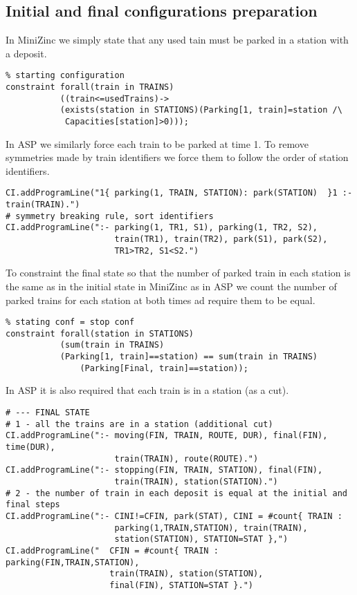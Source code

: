 \documentclass[11pt]{article}
\begin{document}
\subsection{Initial and final configurations preparation}
In MiniZinc we simply state that any used tain must be parked in a station
with a deposit.
\begin{verbatim}
% starting configuration    
constraint forall(train in TRAINS)
           ((train<=usedTrains)->
           (exists(station in STATIONS)(Parking[1, train]=station /\
            Capacities[station]>0))); 
\end{verbatim}
In ASP we similarly force each train to be parked at time 1. To remove
symmetries made by train identifiers we force them to follow the order of
station identifiers.
\begin{verbatim}
CI.addProgramLine("1{ parking(1, TRAIN, STATION): park(STATION)  }1 :- train(TRAIN).")
# symmetry breaking rule, sort identifiers
CI.addProgramLine(":- parking(1, TR1, S1), parking(1, TR2, S2), 
                      train(TR1), train(TR2), park(S1), park(S2),
                      TR1>TR2, S1<S2.")
\end{verbatim}
To constraint the final state so that the number of 
parked train in each station is the same 
as in the initial state in MiniZinc as in ASP we count
the number of parked trains for each
station at both times ad require them to be equal.  
\begin{verbatim}
% stating conf = stop conf
constraint forall(station in STATIONS)
           (sum(train in TRAINS)
           (Parking[1, train]==station) == sum(train in TRAINS)
               (Parking[Final, train]==station));                         
\end{verbatim}
In ASP it is also required that each train is in a station (as a cut).
\begin{verbatim}
# --- FINAL STATE
# 1 - all the trains are in a station (additional cut)
CI.addProgramLine(":- moving(FIN, TRAIN, ROUTE, DUR), final(FIN), time(DUR),
                      train(TRAIN), route(ROUTE).")
CI.addProgramLine(":- stopping(FIN, TRAIN, STATION), final(FIN),
                      train(TRAIN), station(STATION).")
# 2 - the number of train in each deposit is equal at the initial and final steps
CI.addProgramLine(":- CINI!=CFIN, park(STAT), CINI = #count{ TRAIN :
                      parking(1,TRAIN,STATION), train(TRAIN), 
                      station(STATION), STATION=STAT },")
CI.addProgramLine("  CFIN = #count{ TRAIN : parking(FIN,TRAIN,STATION), 
                     train(TRAIN), station(STATION), 
                     final(FIN), STATION=STAT }.")
\end{verbatim}
\end{document}
